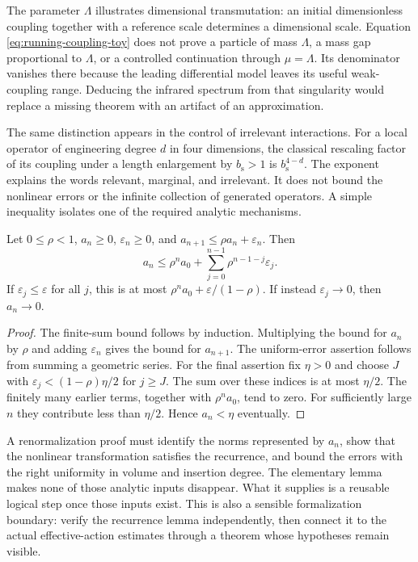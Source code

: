 The parameter $\Lambda$ illustrates dimensional transmutation: an
initial dimensionless coupling together with a reference scale determines
a dimensional scale.  Equation \eqref{eq:running-coupling-toy} does not
prove a particle of mass $\Lambda$, a mass gap proportional to
$\Lambda$, or a controlled continuation through $\mu=\Lambda$.
Its denominator vanishes there because the leading differential model
leaves its useful weak-coupling range.  Deducing the infrared spectrum
from that singularity would replace a missing theorem with an artifact of
an approximation.

The same distinction appears in the control of irrelevant interactions.
For a local operator of engineering degree $d$ in four dimensions, the
classical rescaling factor of its coupling under a length enlargement by
$b_\mathrm{s}>1$ is $b_\mathrm{s}^{4-d}$.  The exponent explains the
words relevant, marginal, and irrelevant.  It does not bound the nonlinear
errors or the infinite collection of generated operators.  A simple
inequality isolates one of the required analytic mechanisms.

\begin{proposition}
Let $0\leq\rho<1$, $a_n\geq0$, $\varepsilon_n\geq0$, and
$a_{n+1}\leq\rho a_n+\varepsilon_n$.  Then
\[
 a_n\leq\rho^n a_0+
       \sum_{j=0}^{n-1}\rho^{n-1-j}\varepsilon_j.
\]
If $\varepsilon_j\leq\varepsilon$ for all $j$, this is at most
$\rho^n a_0+\varepsilon/(1-\rho)$.  If instead
$\varepsilon_j\to0$, then $a_n\to0$.
\end{proposition}

\begin{proof}
The finite-sum bound follows by induction.  Multiplying the bound for
$a_n$ by $\rho$ and adding $\varepsilon_n$ gives the bound for
$a_{n+1}$.  The uniform-error assertion follows from summing a geometric
series.  For the final assertion fix $\eta>0$ and choose $J$ with
$\varepsilon_j<(1-\rho)\eta/2$ for $j\geq J$.  The sum over these
indices is at most $\eta/2$.  The finitely many earlier terms, together
with $\rho^n a_0$, tend to zero.  For sufficiently large $n$ they
contribute less than $\eta/2$.  Hence $a_n<\eta$ eventually.
\end{proof}

A renormalization proof must identify the norms represented by $a_n$,
show that the nonlinear transformation satisfies the recurrence, and bound
the errors with the right uniformity in volume and insertion degree.
The elementary lemma makes none of those analytic inputs disappear.
What it supplies is a reusable logical step once those inputs exist.
This is also a sensible formalization boundary: verify the recurrence
lemma independently, then connect it to the actual effective-action
estimates through a theorem whose hypotheses remain visible.

